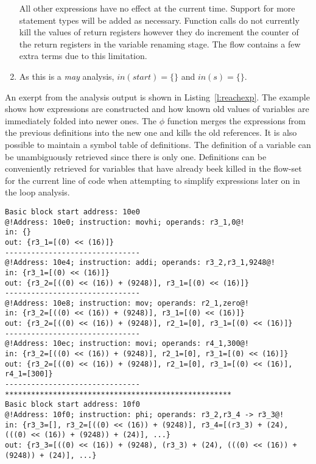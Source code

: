 \begin{enumerate}
  All other expressions have no effect at the current time. Support for more statement types will be added as necessary. Function calls do not currently kill the values of return registers however they do increment the counter of the return registers in the variable renaming stage. The flow contains a few extra terms due to this limitation.
  
  \item As this is a \textit{may} analysis, $in(start)=\{\}$ and $in(s)=\{\}$. 
\end{enumerate}

An exerpt from the analysis output is shown in Listing~\ref{l:reachexp}. The example shows how expressions are constructed and how known old values of variables are immediately folded into newer ones. The $\phi$ function merges the expressions from the previous definitions into the new one and kills the old references. It is also possible to maintain a symbol table of definitions. The definition of a variable can be unambiguously retrieved since there is only one. Definitions can be conveniently retrieved for variables that have already beek killed in the flow-set for the current line of code when attempting to simplify expressions later on in the loop analysis.

\begin{lstlisting}[caption={Example reaching expression analysis},label=l:reachexp,captionpos=t]
Basic block start address: 10e0
@!Address: 10e0; instruction: movhi; operands: r3_1,0@!
in: {}
out: {r3_1=[(0) << (16)]}
-------------------------------
@!Address: 10e4; instruction: addi; operands: r3_2,r3_1,9248@!
in: {r3_1=[(0) << (16)]}
out: {r3_2=[((0) << (16)) + (9248)], r3_1=[(0) << (16)]}
-------------------------------
@!Address: 10e8; instruction: mov; operands: r2_1,zero@!
in: {r3_2=[((0) << (16)) + (9248)], r3_1=[(0) << (16)]}
out: {r3_2=[((0) << (16)) + (9248)], r2_1=[0], r3_1=[(0) << (16)]}
-------------------------------
@!Address: 10ec; instruction: movi; operands: r4_1,300@!
in: {r3_2=[((0) << (16)) + (9248)], r2_1=[0], r3_1=[(0) << (16)]}
out: {r3_2=[((0) << (16)) + (9248)], r2_1=[0], r3_1=[(0) << (16)], r4_1=[300]}
-------------------------------
****************************************************
Basic block start address: 10f0
@!Address: 10f0; instruction: phi; operands: r3_2,r3_4 -> r3_3@!
in: {r3_3=[], r3_2=[((0) << (16)) + (9248)], r3_4=[(r3_3) + (24), (((0) << (16)) + (9248)) + (24)], ...}
out: {r3_3=[((0) << (16)) + (9248), (r3_3) + (24), (((0) << (16)) + (9248)) + (24)], ...}

\end{lstlisting} 

